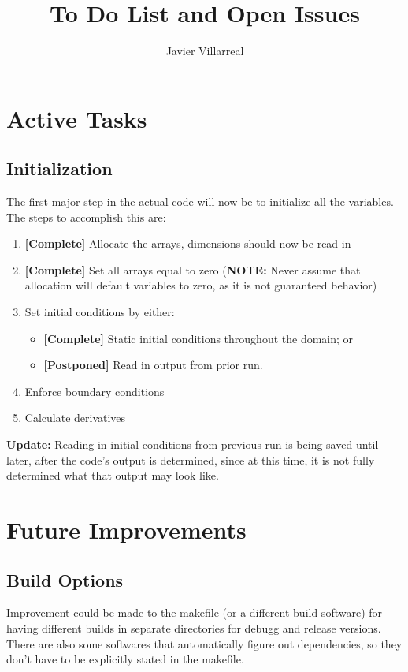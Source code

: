 \documentclass[12pt]{article}
\begin{document}
    \title{To Do List and Open Issues}
    \author{Javier Villarreal}
    \date{}
    \maketitle

    \section{Active Tasks}

    \subsection{Initialization}
    The first major step in the actual code will now be to initialize all the variables. The steps to accomplish this are:
    \begin{enumerate}
        \item \textbf{[Complete]} Allocate the arrays, dimensions should now be read in
        \item \textbf{[Complete]} Set all arrays equal to zero (\textbf{NOTE:} Never assume that allocation will default variables to zero, as it is not guaranteed behavior)
        \item Set initial conditions by either:
        \begin{itemize}
            \item \textbf{[Complete]} Static initial conditions throughout the domain; or
            \item \textbf{[Postponed]} Read in output from prior run.
        \end{itemize}
        \item Enforce boundary conditions
        \item Calculate derivatives
    \end{enumerate}
    
    \textbf{Update:} Reading in initial conditions from previous run is being saved until later, after the code's output is determined, since at this time, it is not fully determined what that output may look like.
    
    \newpage
    \section{Future Improvements}
    \subsection{Build Options}
    Improvement could be made to the makefile (or a different build software) for having different builds in separate directories for debugg and release versions. There are also some softwares that automatically figure out dependencies, so they don't have to be explicitly stated in the makefile.
\end{document}
